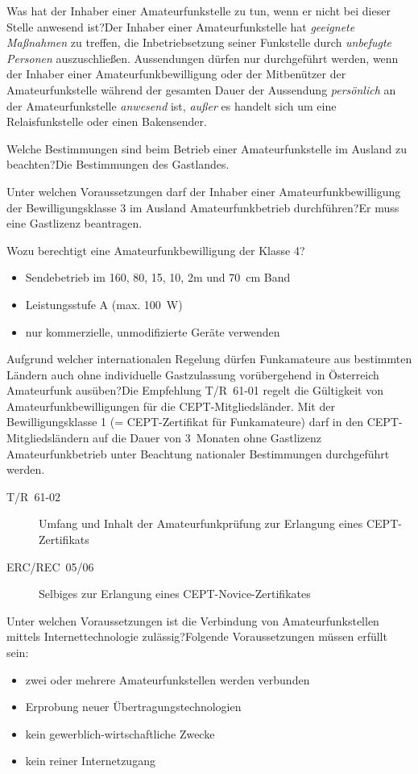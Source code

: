 \documentclass[avery5371,grid,frame,a4paper]{flashcards}
\newcommand{\card}[3]{
  \begin{flashcard}[{\chap} -- #1]{#2}#3\end{flashcard}
}
\begin{document}
\card{56}{Was hat der Inhaber einer Amateurfunkstelle zu tun, wenn er nicht bei dieser Stelle anwesend ist?}{Der Inhaber einer Amateurfunkstelle hat \emph{geeignete Maßnahmen} zu treffen, die Inbetriebsetzung seiner Funkstelle durch \emph{unbefugte Personen} auszuschließen. Aussendungen dürfen nur durchgeführt werden, wenn der Inhaber einer Amateurfunkbewilligung oder der Mitbenützer der Amateurfunkstelle während der gesamten Dauer der Aussendung \emph{persönlich} an der Amateurfunkstelle \emph{anwesend} ist, \emph{außer} es handelt sich um eine Relaisfunkstelle oder einen Bakensender.}

\card{57}{Welche Bestimmungen sind beim Betrieb einer Amateurfunkstelle im Ausland zu beachten?}{Die Bestimmungen des Gastlandes.}

\card{58}{Unter welchen Voraussetzungen darf der Inhaber einer Amateurfunkbewilligung der Bewilligungsklasse 3 im Ausland Amateurfunkbetrieb durchführen?}{Er muss eine Gastlizenz beantragen.}

\card{59}{Wozu berechtigt eine Amateurfunkbewilligung der Klasse 4?}{\begin{itemize}
  \item Sendebetrieb im 160, 80, 15, 10, 2m und \SI{70}{\centi\metre} Band
  \item Leistungsstufe A (max. \SI{100}{\watt})
  \item nur kommerzielle, unmodifizierte Geräte verwenden
\end{itemize}}

\card{60}{Aufgrund welcher internationalen Regelung dürfen Funkamateure aus bestimmten Ländern auch ohne individuelle Gastzulassung vorübergehend in Österreich Amateurfunk ausüben?}{\small Die Empfehlung T/R~61-01 regelt die Gültigkeit von Amateurfunkbewilligungen für die CEPT-Mitgliedsländer. Mit der Bewilligungsklasse 1 (= CEPT-Zertifikat für Funkamateure) darf in den CEPT-Mitgliedsländern auf die Dauer von 3~Monaten ohne Gastlizenz Amateurfunkbetrieb unter Beachtung nationaler Bestimmungen durchgeführt werden.

\begin{description}
  \item[T/R~61-02] Umfang und Inhalt der Amateurfunkprüfung zur Erlangung eines CEPT-Zertifikats
  \item[ERC/REC~05/06] Selbiges zur Erlangung eines CEPT-Novice-Zertifikates
\end{description}
}

\card{61}{Unter welchen Voraussetzungen ist die Verbindung von Amateurfunkstellen mittels Internettechnologie zulässig?}{Folgende Voraussetzungen müssen erfüllt sein:
\begin{itemize}
  \item zwei oder mehrere Amateurfunkstellen werden verbunden
  \item Erprobung neuer Übertragungstechnologien
  \item kein gewerblich-wirtschaftliche Zwecke
  \item kein reiner Internetzugang
\end{itemize}}
\end{document}
